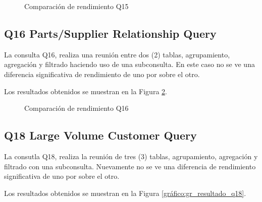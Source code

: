 \documentclass[11pt, twocolumns]{article}
\begin{document}
\begin{multicols}{2}
\begin{figure}[H]
    \caption{Comparación de rendimiento Q15}
	\label{gráfico:gr_resultado_q15}
\end{figure}


\subsection{Q16 Parts/Supplier Relationship Query}
La consulta Q16, realiza una reunión entre dos (2) tablas, agrupamiento, agregación y filtrado haciendo uso de una subconsulta. En este caso no se ve una diferencia significativa de rendimiento de uno por sobre el otro.
\par
Los resultados obtenidos se muestran en la Figura \ref{gráfico:gr_resultado_q16}.

\begin{figure}[H]
    \caption{Comparación de rendimiento Q16}
	\label{gráfico:gr_resultado_q16}
\end{figure}


\subsection{Q18 Large Volume Customer Query}
La consutla Q18, realiza la reunión de tres (3) tablas, agrupamiento, agregación y filtrado con una subconsulta. Nuevamente no se ve una diferencia de rendimiento significativa de uno por sobre el otro.
\par
Los resultados obtenidos se muestran en la Figura \ref{gráfico:gr_resultado_q18}.


\end{multicols}
\end{document}
